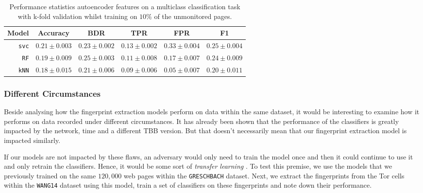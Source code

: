 \begin{table}[ht]
  \centering
  \begin{tabular}{ r  r  r  r  r  r } \hline
    \multicolumn{1}{c}{\textbf{Model}} & \multicolumn{1}{c}{\textbf{Accuracy}} & \multicolumn{1}{c}{\textbf{BDR}} & \multicolumn{1}{c}{\textbf{TPR}} &
      \multicolumn{1}{c}{\textbf{FPR}} & \multicolumn{1}{c}{\textbf{F1}} \\ \hline

    \texttt{svc} & $0.21 \pm 0.003$ & $0.23 \pm 0.002$ & $0.13 \pm 0.002$ & $0.33 \pm 0.004$ & $0.25 \pm 0.004$ \\

    \texttt{RF} & $0.19 \pm 0.009$ & $0.25 \pm 0.003$ & $0.11 \pm 0.008$ & $0.17 \pm 0.007$ & $0.24 \pm 0.009$\\

    \texttt{kNN} & $0.18 \pm 0.015$ & $0.21 \pm 0.006$ & $0.09 \pm 0.006$ & $0.05 \pm 0.007$ & $0.20 \pm 0.011$ \\

    \hline
  \end{tabular}
  \caption{Performance statistics autoencoder features on a multiclass classification task with k-fold validation whilst training on $10\%$ of the unmonitored pages.}
  \label{table:mult-ae-test-error}
\end{table}


\subsubsection{Different Circumstances}

Beside analysing how the fingerprint extraction models perform on data within the same dataset, it would be interesting to examine how it performs on data recorded under different circumstances.
It has already been shown that the performance of the classifiers is greatly impacted by the network, time and a different TBB version.
But that doesn't necessarily mean that our fingerprint extraction model is impacted similarly.

If our models are not impacted by these flaws, an adversary would only need to train the model once and then it could continue to use it and only retrain the classifiers.
Hence, it would be some sort of \textit{transfer learning}
.
To test this premise, we use the models that we previously trained on the same $120,000$ web pages within the \texttt{GRESCHBACH} dataset.
Next, we extract the fingerprints from the Tor cells within the \texttt{WANG14} dataset using this model, train a set of classifiers on these fingerprints and note down their performance.


